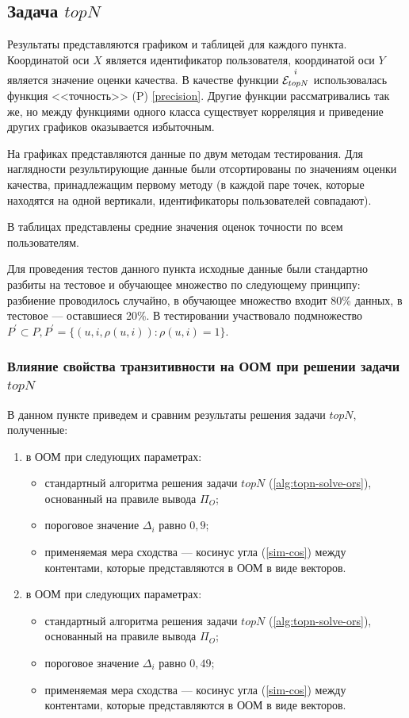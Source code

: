 
\subsection{Задача $topN$}

Результаты представляются графиком и таблицей для каждого пункта.
Координатой оси $X$ является идентификатор пользователя, координатой
оси $Y$ является значение оценки качества.
В качестве функции ${\overset{i}{\mathcal{E}_{topN}}}$ использовалась функция
<<точность>> (P) \ref{precision}.
Другие функции рассматривались так же, но между
функциями одного класса существует корреляция и приведение других графиков
оказывается избыточным.

На графиках представляются данные по двум методам тестирования. Для наглядности
результирующие данные были отсортированы по значениям оценки качества,
принадлежащим первому методу (в каждой паре точек, которые находятся на одной
вертикали, идентификаторы пользователей совпадают).

В таблицах представлены средние значения оценок точности по всем пользователям.


Для проведения тестов данного пункта исходные данные были
стандартно разбиты на тестовое и обучающее множество по следующему принципу:
разбиение проводилось случайно, в обучающее множество входит
80\% данных, в тестовое --- оставшиеся 20\%. В тестировании участвовало
подмножество $P^{\prime} \subset P, P^{\prime} = \{(u, i, \rho(u, i)):
\rho(u, i) = 1\}$.

\subsubsection{Влияние свойства транзитивности на ООМ при решении задачи $topN$}
В данном пункте приведем и сравним результаты решения задачи $topN$, полученные:
\begin{enumerate}
	\item  в ООМ при следующих параметрах:
		\begin{itemize}
			\item
			стандартный алгоритма решения задачи
			$topN$ (\ref{alg:topn-solve-ors}), основанный на
			правиле вывода $\Pi_O$;
			\item
			пороговое значение $\Delta_i$ равно $0,9$;
			\item
		применяемая мера сходства --- косинус угла (\ref{sim-cos})
		между контентами, которые представляются в ООМ в виде векторов.
		\end{itemize}
	\item  в ООМ при следующих параметрах:
		\begin{itemize}
			\item
			стандартный алгоритма решения задачи
			$topN$ (\ref{alg:topn-solve-ors}), основанный на
			правиле вывода $\Pi_O$;
			\item
			пороговое значение $\Delta_i$ равно $0,49$;
			\item
		применяемая мера сходства --- косинус угла (\ref{sim-cos})
		между контентами, которые представляются в ООМ в виде векторов.
		\end{itemize}
\end{enumerate}


